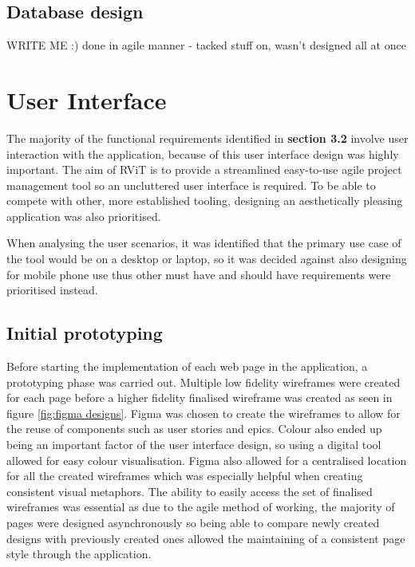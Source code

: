 \documentclass[l4proj.tex]{subfiles}
\begin{document}

\subsection{Database design}
WRITE ME :)
done in agile manner - tacked stuff on, wasn't designed all at once

\section{User Interface}
The majority of the functional requirements identified in \textbf{section 3.2} involve user interaction with the application, because of this user interface design was highly important. The aim of RViT is to provide a streamlined easy-to-use agile project management tool so an uncluttered user interface is required. To be able to compete with other, more established tooling, designing an aesthetically pleasing application was also prioritised. 

When analysing the user scenarios, it was identified that the primary use case of the tool would be on a desktop or laptop, so it was decided against also designing for mobile phone use thus other must have and should have requirements were prioritised instead.


\subsection{Initial prototyping}
Before starting the implementation of each web page in the application, a prototyping phase was carried out. Multiple low fidelity wireframes were created for each page before a higher fidelity finalised wireframe was created as seen in figure \ref{fig:figma designs}. Figma was chosen to create the wireframes to allow for the reuse of components such as user stories and epics. Colour also ended up being an important factor of the user interface design, so using a digital tool allowed for easy colour visualisation. Figma also allowed for a centralised location for all the created wireframes which was especially helpful when creating consistent visual metaphors. The ability to easily access the set of finalised wireframes was essential as due to the agile method of working, the majority of pages were designed asynchronously so being able to compare newly created designs with previously created ones allowed the maintaining of a consistent page style through the application. 
\end{document}
